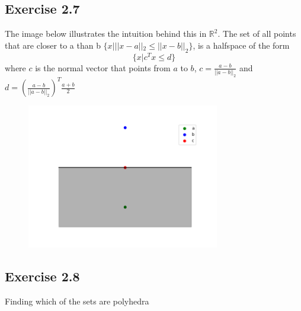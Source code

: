 \subsection{Exercise 2.7}
The image below illustrates the intuition behind this in $\mathbb{R}^2$. The set of all points that are closer to a than b $\{x | ||x-a||_2 \leq ||x-b||_2\}$, is a halfspace of the form 
\begin{equation}
  \{x| c^T x \leq d \}
\end{equation} where $c$ is the normal vector that points from $a$ to $b$, $ c = \frac{a-b}{||a-b||_2}$ and $d = (\frac{a-b}{||a-b||_2})^T \frac{a+b}{2}$
\begin{figure}[htbp]
  \centerline{\includegraphics[width=0.75\textwidth]{hw1/images/voronoi_halfspace.png}}
\end{figure}
\subsection{Exercise 2.8}
Finding which of the sets are polyhedra
